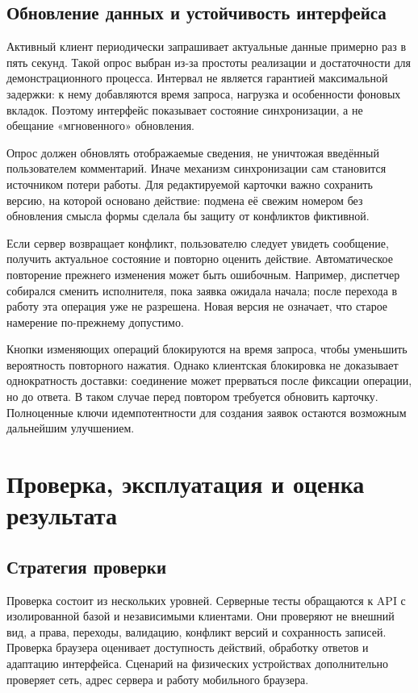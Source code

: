 \documentclass{timcw}
\begin{document}
\section{Обновление данных и устойчивость интерфейса}

Активный клиент периодически запрашивает актуальные данные примерно раз в пять секунд. Такой опрос выбран из-за простоты реализации и достаточности для демонстрационного процесса. Интервал не является гарантией максимальной задержки: к нему добавляются время запроса, нагрузка и особенности фоновых вкладок. Поэтому интерфейс показывает состояние синхронизации, а не обещание «мгновенного» обновления.

Опрос должен обновлять отображаемые сведения, не уничтожая введённый пользователем комментарий. Иначе механизм синхронизации сам становится источником потери работы. Для редактируемой карточки важно сохранить версию, на которой основано действие: подмена её свежим номером без обновления смысла формы сделала бы защиту от конфликтов фиктивной.

Если сервер возвращает конфликт, пользователю следует увидеть сообщение, получить актуальное состояние и повторно оценить действие. Автоматическое повторение прежнего изменения может быть ошибочным. Например, диспетчер собирался сменить исполнителя, пока заявка ожидала начала; после перехода в работу эта операция уже не разрешена. Новая версия не означает, что старое намерение по-прежнему допустимо.

Кнопки изменяющих операций блокируются на время запроса, чтобы уменьшить вероятность повторного нажатия. Однако клиентская блокировка не доказывает однократность доставки: соединение может прерваться после фиксации операции, но до ответа. В таком случае перед повтором требуется обновить карточку. Полноценные ключи идемпотентности для создания заявок остаются возможным дальнейшим улучшением.

\chapter{Проверка, эксплуатация и оценка результата}

\section{Стратегия проверки}

Проверка состоит из нескольких уровней. Серверные тесты обращаются к API с изолированной базой и независимыми клиентами. Они проверяют не внешний вид, а права, переходы, валидацию, конфликт версий и сохранность записей. Проверка браузера оценивает доступность действий, обработку ответов и адаптацию интерфейса. Сценарий на физических устройствах дополнительно проверяет сеть, адрес сервера и работу мобильного браузера.
\end{document}
